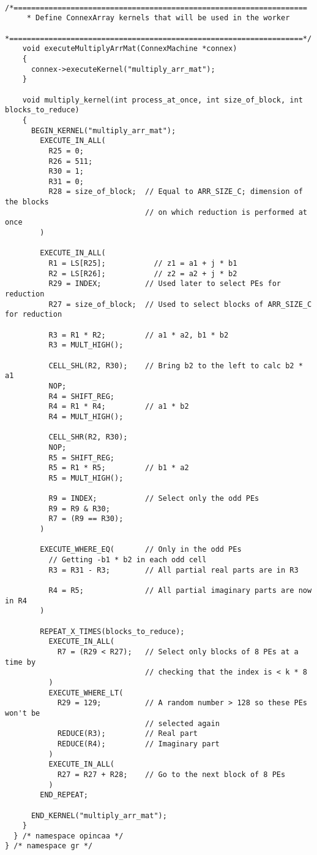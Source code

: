 \begin{lstlisting}
    /*===================================================================
     * Define ConnexArray kernels that will be used in the worker
     *===================================================================*/
    void executeMultiplyArrMat(ConnexMachine *connex)
    {
      connex->executeKernel("multiply_arr_mat");
    }

    void multiply_kernel(int process_at_once, int size_of_block, int blocks_to_reduce)
    {
      BEGIN_KERNEL("multiply_arr_mat");
        EXECUTE_IN_ALL(
          R25 = 0;
          R26 = 511;
          R30 = 1;
          R31 = 0;
          R28 = size_of_block;  // Equal to ARR_SIZE_C; dimension of the blocks
                                // on which reduction is performed at once
        )

        EXECUTE_IN_ALL(
          R1 = LS[R25];           // z1 = a1 + j * b1
          R2 = LS[R26];           // z2 = a2 + j * b2
          R29 = INDEX;          // Used later to select PEs for reduction
          R27 = size_of_block;  // Used to select blocks of ARR_SIZE_C for reduction

          R3 = R1 * R2;         // a1 * a2, b1 * b2
          R3 = MULT_HIGH();

          CELL_SHL(R2, R30);    // Bring b2 to the left to calc b2 * a1
          NOP;
          R4 = SHIFT_REG;
          R4 = R1 * R4;         // a1 * b2
          R4 = MULT_HIGH();

          CELL_SHR(R2, R30);
          NOP;
          R5 = SHIFT_REG;
          R5 = R1 * R5;         // b1 * a2
          R5 = MULT_HIGH();

          R9 = INDEX;           // Select only the odd PEs
          R9 = R9 & R30;
          R7 = (R9 == R30);
        )

        EXECUTE_WHERE_EQ(       // Only in the odd PEs
          // Getting -b1 * b2 in each odd cell
          R3 = R31 - R3;        // All partial real parts are in R3

          R4 = R5;              // All partial imaginary parts are now in R4
        )

        REPEAT_X_TIMES(blocks_to_reduce);
          EXECUTE_IN_ALL(
            R7 = (R29 < R27);   // Select only blocks of 8 PEs at a time by
                                // checking that the index is < k * 8
          )
          EXECUTE_WHERE_LT(
            R29 = 129;          // A random number > 128 so these PEs won't be
                                // selected again
            REDUCE(R3);         // Real part
            REDUCE(R4);         // Imaginary part
          )
          EXECUTE_IN_ALL(
            R27 = R27 + R28;    // Go to the next block of 8 PEs
          )
        END_REPEAT;

      END_KERNEL("multiply_arr_mat");
    }
  } /* namespace opincaa */
} /* namespace gr */
                \end{lstlisting}

